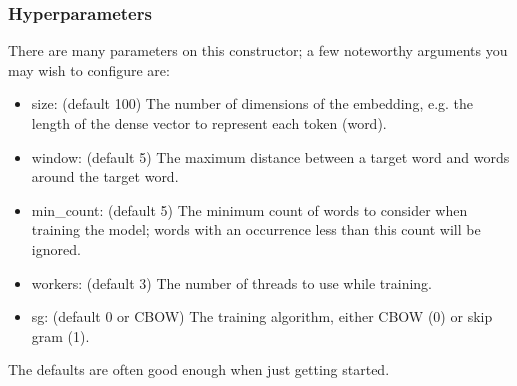 


\begin{frame}[fragile]\frametitle{Hyperparameters }
There are many parameters on this constructor; a few noteworthy arguments you may wish to configure are:
\begin{itemize}
\item size: (default 100) The number of dimensions of the embedding, e.g. the length of the dense vector to represent each token (word).
\item window: (default 5) The maximum distance between a target word and words around the target word.
\item min\_count: (default 5) The minimum count of words to consider when training the model; words with an occurrence less than this count will be ignored.
\item workers: (default 3) The number of threads to use while training.
\item sg: (default 0 or CBOW) The training algorithm, either CBOW (0) or skip gram (1).
\end{itemize}

The defaults are often good enough when just getting started.
\end{frame}

